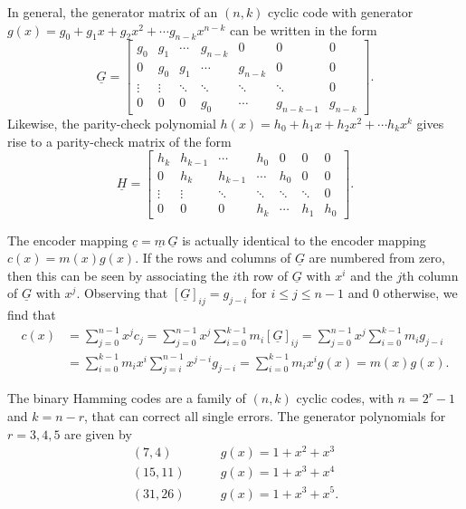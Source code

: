 In general, the generator matrix of an $(n,k)$ cyclic code with generator $g(x)=g_0 + g_1 x + g_2 x^2 + \cdots g_{n-k} x^{n-k}$ can be written in the form
\[ \underline{G} = \left[ \begin{array}{ccccccc}
g_0 & g_1 & \cdots & g_{n-k} & 0 & 0 & 0 \\
0 & g_0 & g_1 & \cdots & g_{n-k} & 0 & 0 \\
\vdots & \vdots & \ddots & \ddots & \ddots & \ddots & 0 \\
0 & 0 & 0 & g_0 & \cdots & g_{n-k-1} & g_{n-k} \end{array} \right]. \]
Likewise, the parity-check polynomial $h(x) = h_0 + h_1 x + h_2 x^2 + \cdots h_{k} x^k$ gives rise to a parity-check matrix of the form
\[ \underline{H} = \left[ \begin{array}{ccccccc}
h_k & h_{k-1} & \cdots & h_0 & 0 & 0 & 0 \\
0 & h_k & h_{k-1} & \cdots & h_0 & 0 & 0 \\
\vdots & \vdots & \ddots & \ddots & \ddots & \ddots & 0 \\
0 & 0 & 0 & h_k & \cdots & h_1 & h_0 \end{array} \right]. \]

The encoder mapping $\underline{c} = \underline{m} \, \underline{G}$ is actually identical to the encoder mapping $c(x) = m(x) g(x)$.
If the rows and columns of $\underline{G}$ are numbered from zero, then this can be seen by associating the $i$th row of $\underline{G}$ with $x^i$ and the $j$th column of $\underline{G}$ with $x^j$.
Observing that $[\underline{G}]_{ij} = g_{j-i}$ for $i \leq j \leq n-1$ and 0 otherwise, we find that
\begin{align*}
c(x)
&= \sum_{j=0}^{n-1} x^j c_j 
= \sum_{j=0}^{n-1} x^j \sum_{i=0}^{k-1} m_i [\underline{G}]_{ij} 
= \sum_{j=0}^{n-1} x^j \sum_{i=0}^{k-1} m_i g_{j-i} \\
&= \sum_{i=0}^{k-1} m_i x^i \sum_{j=i}^{n-1} x^{j-i} g_{j-i} 
= \sum_{i=0}^{k-1} m_i x^i g(x) 
= m(x) g(x).
\end{align*}

\begin{example}
The binary Hamming codes are a family of $(n,k)$ cyclic codes, with $n=2^r - 1$ and $k=n-r$, that can correct all single errors.
The generator polynomials for $r=3,4,5$ are given by
\begin{align*}
(7,4) & \quad \quad g(x) = 1+x^2+x^3 \\
(15,11) & \quad \quad g(x) = 1+x^3+x^4 \\
(31,26) & \quad \quad g(x) = 1+x^3+x^5.
\end{align*}
\end{example}

